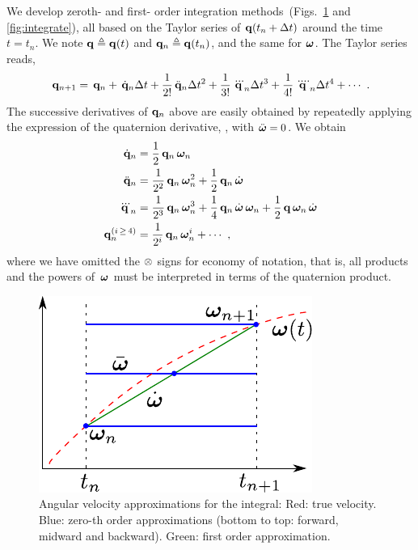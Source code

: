 We develop zeroth- and first- order integration methods~(Figs.~\ref{fig:quatInt} and \ref{fig:integrate}), all based on the Taylor series of ${\bf q}(t_n+\Delta t)$ around the time $t=t_n$. 
We note ${\bf q}\triangleq{\bf q}(t)$ and ${\bf q}_n\triangleq{\bf q}(t_n)$, and the same for ${\bm \omega}$. 
%
The Taylor series reads, 
%
\begin{align}
\,{\bf q}_{n+1} = \,{\bf q}_n + \,\dot{{\bf q}}_n\Delta t + \frac1{2!}\,\ddot{{\bf q}}_n\Delta t^2 + \frac1{3!}\,\dddot{{\bf q}}_n\Delta t^3 + \frac1{4!}\,\ddddot{\bf q}_n\Delta t^4 + \cdots~.
\label{equ:qnTaylor}
\end{align}
%
The successive derivatives of ${\bf q}_n$ above are easily obtained by repeatedly applying the expression of the quaternion derivative, , with $\ddot{{\bm \omega}}=0$. We obtain
%
\begin{subequations}
%
\begin{align}
\,\dot{{\bf q}}_n 
&= \frac12\,{\bf q}_n\,{\bm \omega}_n \\
\,\ddot{{\bf q}}_n 
&= \frac1{2^2}\,{\bf q}_n\,{\bm \omega}_n^2+\frac12\,{\bf q}_n\,\dot{{\bm \omega}} \\
\,\dddot{{\bf q}}_n 
&= \frac1{2^3}\,{\bf q}_n\,{\bm \omega}_n^3 + \frac14\,{\bf q}_n\,\dot{{\bm \omega}}\,{\bm \omega}_n + \frac12\,{\bf q}\,{\bm \omega}_n\,\dot{{\bm \omega}} \\
\,{\bf q}_n^{(i\,\ge\,4)} 
&= \frac1{2^i}\,{\bf q}_n\,{\bm \omega}_n^i + \cdots~,
\end{align}%
\label{equ:qnDerivatives}%
\end{subequations}%
%
where we have omitted the $\otimes$ signs for economy of notation, that is, all products and the powers of $\,{\bm \omega}$ must be interpreted in terms of the quaternion product.

\begin{figure}[tb]
\centering
\includegraphics{figures/integral}
\caption{Angular velocity approximations for the integral: Red: true velocity. Blue: zero-th order approximations (bottom to top: forward, midward and backward). Green: first order approximation.}
\label{fig:quatInt}
\end{figure}

